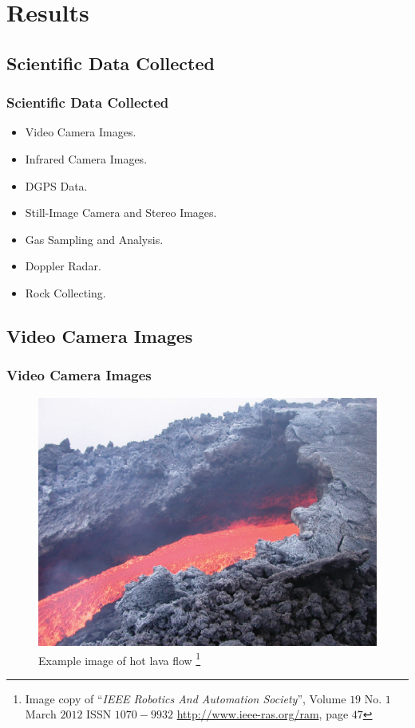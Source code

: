 \documentclass[xcolor=svgnames]{beamer}
\begin{document}
\section{Results}
\subsection{Scientific Data Collected}
\begin{frame}
\frametitle{Scientific Data Collected}
  \begin{itemize}
   \item Video Camera Images. \pause
   \item Infrared Camera Images. \pause
   \item DGPS Data. \pause
   \item Still-Image Camera and Stereo Images. \pause
   \item Gas Sampling and Analysis. \pause
   \item Doppler Radar. \pause
   \item Rock Collecting.
  \end{itemize}
\end{frame}

\subsection{Video Camera Images}
\begin{frame}
\frametitle{Video Camera Images}
  \begin{figure}[H]
	\centering
		\includegraphics[scale=0.43]{image1.png}
	\caption{Example image of hot lava flow \footnote{Image copy of ``\textit{IEEE Robotics And Automation Society}'', Volume $19$ No. $1$ March $2012$ ISSN $1070-9932$ \url{http://www.ieee-ras.org/ram}, page $47$}}
	\label{fig1}
\end{figure}
\end{frame}
\end{document}
